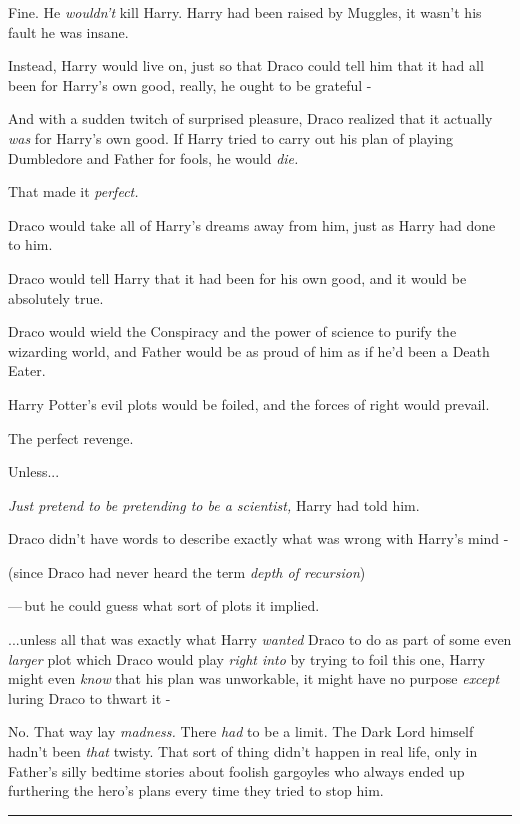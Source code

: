 Fine. He \emph{wouldn't} kill Harry. Harry had been raised by Muggles, it wasn't his fault he was insane.

Instead, Harry would live on, just so that Draco could tell him that it had all been for Harry's own good, really, he ought to be grateful -

And with a sudden twitch of surprised pleasure, Draco realized that it actually \emph{was} for Harry's own good. If Harry tried to carry out his plan of playing Dumbledore and Father for fools, he would \emph{die.}

That made it \emph{perfect.}

Draco would take all of Harry's dreams away from him, just as Harry had done to him.

Draco would tell Harry that it had been for his own good, and it would be absolutely true.

Draco would wield the Conspiracy and the power of science to purify the wizarding world, and Father would be as proud of him as if he'd been a Death Eater.

Harry Potter's evil plots would be foiled, and the forces of right would prevail.

The perfect revenge.

Unless...

\emph{Just pretend to be pretending to be a scientist,} Harry had told him.

Draco didn't have words to describe exactly what was wrong with Harry's mind -

(since Draco had never heard the term \emph{depth of recursion})

---\,but he could guess what sort of plots it implied.

...unless all that was exactly what Harry \emph{wanted} Draco to do as part of some even \emph{larger} plot which Draco would play \emph{right into} by trying to foil this one, Harry might even \emph{know} that his plan was unworkable, it might have no purpose \emph{except} luring Draco to thwart it -

No. That way lay \emph{madness.} There \emph{had} to be a limit. The Dark Lord himself hadn't been \emph{that} twisty. That sort of thing didn't happen in real life, only in Father's silly bedtime stories about foolish gargoyles who always ended up furthering the hero's plans every time they tried to stop him.

\begin{center}\rule{3in}{0.4pt}\end{center}

